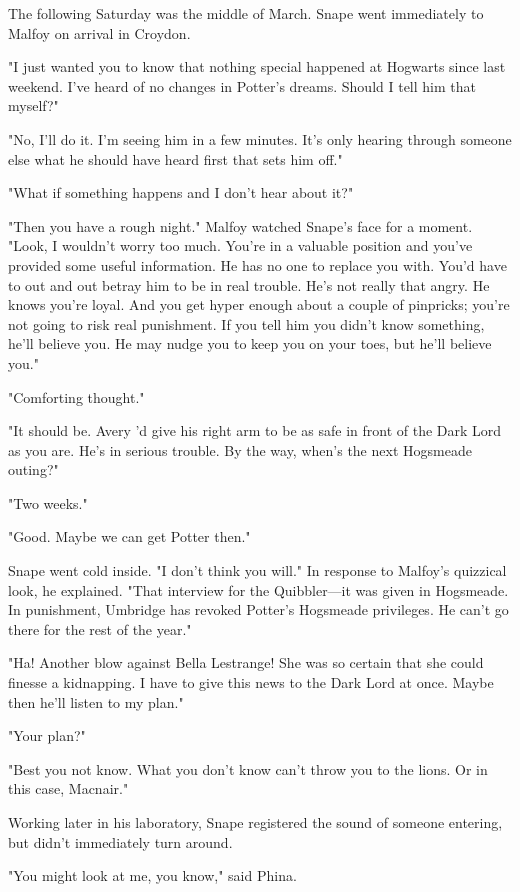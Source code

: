 The following Saturday was the middle of March. Snape went immediately to Malfoy on arrival in Croydon.

"I just wanted you to know that nothing special happened at Hogwarts since last weekend. I've heard of no changes in Potter's dreams. Should I tell him that myself?"

"No, I'll do it. I'm seeing him in a few minutes. It's only hearing through someone else what he should have heard first that sets him off."

"What if something happens and I don't hear about it?"

"Then you have a rough night." Malfoy watched Snape's face for a moment. "Look, I wouldn't worry too much. You're in a valuable position and you've provided some useful information. He has no one to replace you with. You'd have to out and out betray him to be in real trouble. He's not really that angry. He knows you're loyal. And you get hyper enough about a couple of pinpricks; you're not going to risk real punishment. If you tell him you didn't know something, he'll believe you. He may nudge you to keep you on your toes, but he'll believe you."

"Comforting thought."

"It should be. Avery 'd give his right arm to be as safe in front of the Dark Lord as you are. He's in serious trouble. By the way, when's the next Hogsmeade outing?"

"Two weeks."

"Good. Maybe we can get Potter then."

Snape went cold inside. "I{\el} don't think you will." In response to Malfoy's quizzical look, he explained. "That interview for the Quibbler—it was given in Hogsmeade. In punishment, Umbridge has revoked Potter's Hogsmeade privileges. He can't go there for the rest of the year."

"Ha! Another blow against Bella Lestrange! She was so certain that she could finesse a kidnapping. I have to give this news to the Dark Lord at once. Maybe then he'll listen to my plan."

"Your plan?"

"Best you not know. What you don't know can't throw you to the lions. Or in this case, Macnair."

Working later in his laboratory, Snape registered the sound of someone entering, but didn't immediately turn around.

"You might look at me, you know," said Phina.

